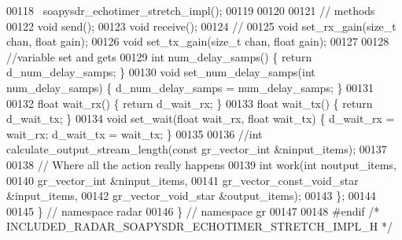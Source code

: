 \begin{DoxyCode}
00118       ~soapysdr_echotimer_stretch_impl();
00119 
00120 
00121       \textcolor{comment}{// methods}
00122       \textcolor{keywordtype}{void} send();
00123       \textcolor{keywordtype}{void} receive();
00124       \textcolor{comment}{//}
00125       \textcolor{keywordtype}{void} set_rx_gain(\textcolor{keywordtype}{size\_t} chan, \textcolor{keywordtype}{float} gain);
00126       \textcolor{keywordtype}{void} set_tx_gain(\textcolor{keywordtype}{size\_t} chan, \textcolor{keywordtype}{float} gain);
00127 
00128       \textcolor{comment}{//variable set and gets}
00129       \textcolor{keywordtype}{int} num_delay_samps() \{ \textcolor{keywordflow}{return} d_num_delay_samps; \}
00130       \textcolor{keywordtype}{void} set_num_delay_samps(\textcolor{keywordtype}{int} num_delay_samps) \{ d\_num\_delay\_samps = 
      num_delay_samps; \}
00131 
00132       \textcolor{keywordtype}{float} wait_rx() \{ \textcolor{keywordflow}{return} d_wait_rx; \}
00133       \textcolor{keywordtype}{float} wait_tx() \{ \textcolor{keywordflow}{return} d_wait_tx; \}
00134       \textcolor{keywordtype}{void} set_wait(\textcolor{keywordtype}{float} wait_rx, \textcolor{keywordtype}{float} wait_tx) \{ d\_wait\_rx = wait_rx; d\_wait\_tx = 
      wait_tx; \}
00135 
00136       \textcolor{comment}{//int calculate\_output\_stream\_length(const gr\_vector\_int &ninput\_items);}
00137 
00138       \textcolor{comment}{// Where all the action really happens}
00139       \textcolor{keywordtype}{int} work(\textcolor{keywordtype}{int} noutput\_items,
00140            gr\_vector\_int &ninput\_items,
00141            gr\_vector\_const\_void\_star &input\_items,
00142            gr\_vector\_void\_star &output\_items);
00143     \};
00144 
00145   \} \textcolor{comment}{// namespace radar}
00146 \} \textcolor{comment}{// namespace gr}
00147 
00148 \textcolor{preprocessor}{#endif }\textcolor{comment}{/* INCLUDED\_RADAR\_SOAPYSDR\_ECHOTIMER\_STRETCH\_IMPL\_H */}\textcolor{preprocessor}{}
\end{DoxyCode}
